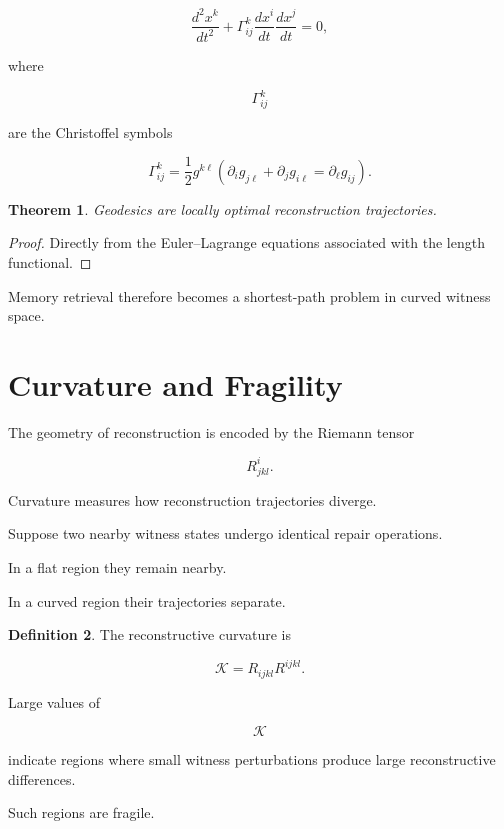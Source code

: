 \documentclass[12pt,oneside]{book}
\theoremstyle{plain} \newtheorem{theorem}{Theorem}[chapter] \newtheorem{lemma}[theorem]{Lemma} \newtheorem{proposition}[theorem]{Proposition} \newtheorem{corollary}[theorem]{Corollary}
\theoremstyle{definition} \newtheorem{definition}[theorem]{Definition} \newtheorem{axiom}[theorem]{Axiom} \newtheorem{construction}[theorem]{Construction}
\theoremstyle{remark} \newtheorem{remark}[theorem]{Remark} \newtheorem{example}[theorem]{Example}
\begin{document}
\[
\frac{d^2x^k}{dt^2}
+
\Gamma^k_{ij}
\frac{dx^i}{dt}
\frac{dx^j}{dt}
=
0,
\]

where

\[
\Gamma^k_{ij}
\]

are the Christoffel symbols

\[
\Gamma^k_{ij}
=
\frac12
g^{k\ell}
\left(
\partial_i g_{j\ell}
+
\partial_j g_{i\ell}
=
\partial_\ell g_{ij}
\right).
\]

\begin{theorem}

Geodesics are locally optimal reconstruction trajectories.

\end{theorem}

\begin{proof}

Directly from the Euler--Lagrange equations associated with the length functional.

\end{proof}

Memory retrieval therefore becomes a shortest-path problem in curved witness space.

\section{Curvature and Fragility}

The geometry of reconstruction is encoded by the Riemann tensor

\[
R^i_{jkl}.
\]

Curvature measures how reconstruction trajectories diverge.

Suppose two nearby witness states undergo identical repair operations.

In a flat region they remain nearby.

In a curved region their trajectories separate.

\begin{definition}

The reconstructive curvature is

\[
\mathcal K
=
R_{ijkl}
R^{ijkl}.
\]

\end{definition}

Large values of

\[
\mathcal K
\]

indicate regions where small witness perturbations produce large reconstructive differences.

Such regions are fragile.
\end{document}
